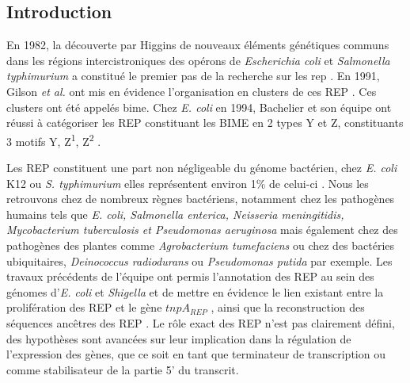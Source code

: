\documentclass[12pt,a4paper]{report}
\begin{document}
\begin{onehalfspace}

\cleardoublepage
{}
	
\tableofcontents

\cleardoublepage
{}


\chapter*{Introduction}
\setcounter{page}{1}

En 1982, la découverte par Higgins de nouveaux éléments génétiques communs dans les régions intercistroniques des opérons de \textit{Escherichia coli} et \textit{Salmonella typhimurium} a constitué le premier pas de la recherche sur les \gls{rep} \citep{Higgins1982}. En 1991, Gilson \textit{et al.} ont mis en évidence l'organisation en clusters de ces REP \citep{Gilson1991}. Ces clusters ont été appelés \gls{bime}. Chez \textit{E. coli} en 1994, Bachelier et son équipe ont réussi à catégoriser les REP constituant les BIME en 2 types Y et Z, constituants 3 motifs Y, Z\textsuperscript{1}, Z\textsuperscript{2}  \citep{Bachellier1994}.
 
Les REP constituent une part non négligeable du génome bactérien, chez \textit{E. coli} K12 ou \textit{S. typhimurium} elles représentent environ 1\% de celui-ci \citep{Gilson1991}. Nous les retrouvons chez de nombreux règnes bactériens, notamment chez les pathogènes humains tels que \textit{E. coli, Salmonella enterica, Neisseria meningitidis, Mycobacterium tuberculosis et Pseudomonas aeruginosa} mais également chez des pathogènes des plantes comme \textit{Agrobacterium tumefaciens} ou chez des bactéries ubiquitaires, \textit{Deinococcus radiodurans} ou \textit{Pseudomonas putida} par exemple. Les travaux précédents de l'équipe ont permis l'annotation des REP au sein des génomes d'\textit{E. coli} et \textit{Shigella} et de mettre en évidence le lien existant entre la prolifération des REP et le gène $tnpA_{REP}$ \citep{Weyder2013,Bosc2014}, ainsi que la reconstruction des séquences ancêtres des REP \citep{Bosc2014}. Le rôle exact des REP n'est pas clairement défini, des hypothèses sont avancées sur leur implication dans la régulation de l'expression des gènes, que ce soit en tant que terminateur de transcription ou comme stabilisateur de la partie 5' du transcrit.


\end{onehalfspace}
\end{document}
